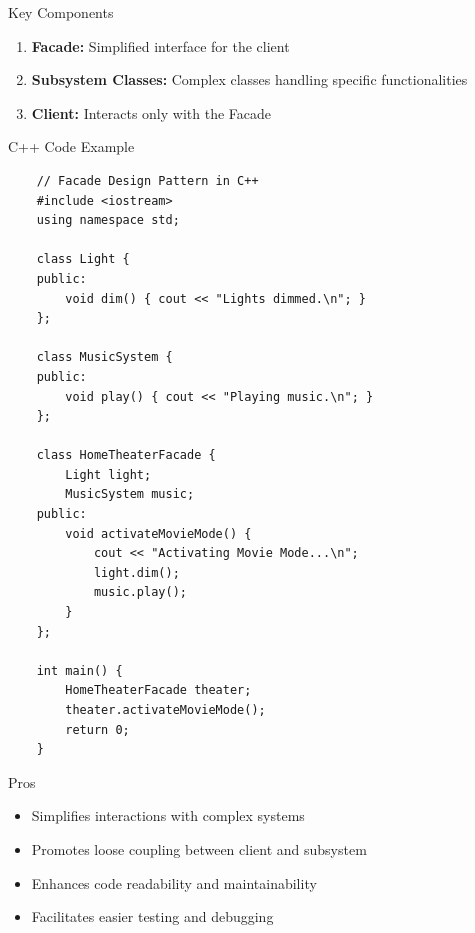 \documentclass{beamer}
\begin{document}



\begin{frame}{Key Components}
    \begin{enumerate}
        \item \textbf{Facade:} Simplified interface for the client
        \item \textbf{Subsystem Classes:} Complex classes handling specific functionalities
        \item \textbf{Client:} Interacts only with the Facade
    \end{enumerate}
\end{frame}



\begin{frame}[fragile]{C++ Code Example}
    \begin{lstlisting}
    // Facade Design Pattern in C++
    #include <iostream>
    using namespace std;
    
    class Light {
    public:
        void dim() { cout << "Lights dimmed.\n"; }
    };
    
    class MusicSystem {
    public:
        void play() { cout << "Playing music.\n"; }
    };
    
    class HomeTheaterFacade {
        Light light;
        MusicSystem music;
    public:
        void activateMovieMode() {
            cout << "Activating Movie Mode...\n";
            light.dim();
            music.play();
        }
    };
    
    int main() {
        HomeTheaterFacade theater;
        theater.activateMovieMode();
        return 0;
    }
    \end{lstlisting}
    \end{frame}

\begin{frame}{Pros}
    \begin{itemize}
        \item Simplifies interactions with complex systems
        \item Promotes loose coupling between client and subsystem
        \item Enhances code readability and maintainability
        \item Facilitates easier testing and debugging
    \end{itemize}
\end{frame}
\end{document}
